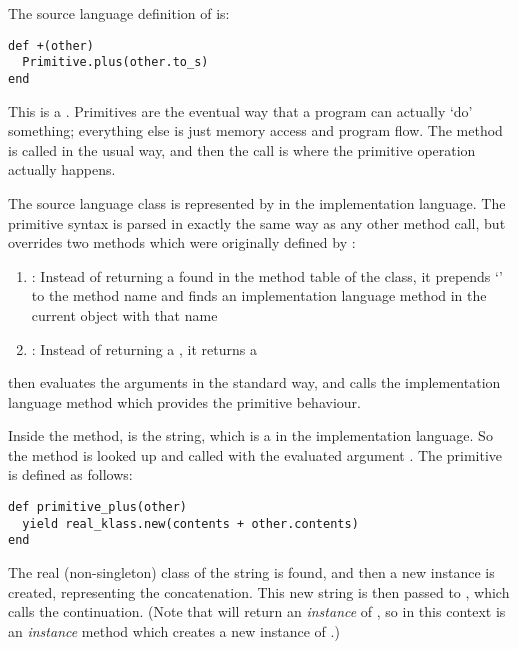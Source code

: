 The source language definition of  is:

\begin{lstlisting}
def +(other)
  Primitive.plus(other.to_s)
end
\end{lstlisting}

This is a . Primitives are the eventual way that a program can actually `do' something; everything else is just memory access and program flow. The \code{+} method is called in the usual way, and then the  call is where the primitive operation actually happens.

The source language  class is represented by  in the implementation language. The primitive syntax is parsed in exactly the same way as any other method call, but \- overrides two methods which were originally defined by :

\begin{enumerate}
  \item \textbf{}: Instead of returning a  found in the method table of the class, it prepends `' to the method name and finds an implementation language method in the current  object with that name
  
  \item \textbf{}: Instead of returning a , it returns a 
\end{enumerate}

 then evaluates the arguments in the standard way, and calls the implementation language method which provides the primitive behaviour.

Inside the \code{+} method,  is the  string, which is a  in the implementation language. So the  method is looked up and called with the evaluated argument . The primitive is defined as follows:

\begin{lstlisting}
def primitive_plus(other)
  yield real_klass.new(contents + other.contents)
end
\end{lstlisting}

The real (non-singleton) class of the string is found, and then a new instance is created, representing the concatenation. This new string is then passed to , which calls the continuation. (Note that  will return an \textit{instance} of , so in this context  is an \textit{instance} method which creates a new instance of .)

